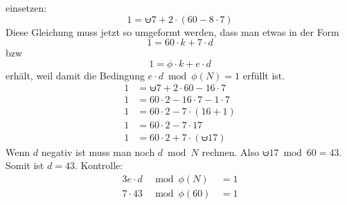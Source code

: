 einsetzen:
\begin{equation}
	1 = \uminus 7 + 2 \cdot (60 - 8 \cdot 7)
\end{equation}
Diese Gleichung muss jetzt so umgeformt werden, dass man etwas in der Form
\[
	1 = 60 \cdot k + 7 \cdot d
\]
bzw
\[
	1 = \phi \cdot k + e \cdot d
\]
erhält, weil damit die Bedingung $e \cdot d \bmod \phi(N) = 1$ erfüllt ist.
\begin{align}
1 & = \uminus 7 + 2 \cdot 60 - 16 \cdot 7 \\
1 & = 60 \cdot 2 - 16 \cdot 7 - 1 \cdot 7 \\
1 & = 60 \cdot 2 - 7 \cdot (16 + 1) \\
1 & = 60 \cdot 2 - 7 \cdot 17 \\
1 & = 60 \cdot 2 + 7 \cdot (\uminus 17)
\end{align}
Wenn $d$ negativ ist muss man noch $d \bmod N$ rechnen. Also $\uminus 17 \bmod
60 = 43$. Somit ist $d = 43$. Kontrolle:
\begin{alignat*}{3}
	e \cdot d & \bmod \phi(N) & \, = 1 \\
	7 \cdot 43 & \bmod \phi(60) & \, = 1
\end{alignat*}
